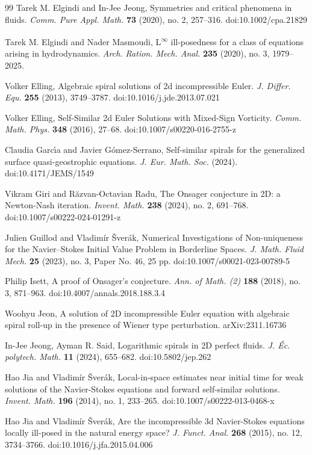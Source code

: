 \documentclass[11pt]{article}
\theoremstyle{definition}
\theoremstyle{remark}
\numberwithin{equation}{section}
\newcommand{\tbf}{\textbf}
\newcommand{\tsup}{\textsuperscript}
\begin{document}
\begin{flushleft}
\begin{thebibliography}{99}
 Tarek M. Elgindi and In-Jee Jeong, Symmetries and critical phenomena in fluids. \textit{Comm. Pure Appl. Math.} \tbf{73} (2020), no. 2, 257–316. doi:10.1002/cpa.21829

 Tarek M. Elgindi and Nader Masmoudi, L\tsup{$\infty$} ill-posedness for a class of equations arising in hydrodynamics. \textit{Arch. Ration. Mech. Anal.} \tbf{235} (2020), no. 3, 1979–2025.

 Volker Elling, Algebraic spiral solutions of 2d incompressible Euler. \textit{J. Differ. Equ.} \tbf{255} (2013), 3749–3787. doi:10.1016/j.jde.2013.07.021

 Volker Elling, Self-Similar 2d Euler Solutions with Mixed-Sign Vorticity. \textit{Comm. Math. Phys.} \tbf{348} (2016), 27–68. doi:10.1007/s00220-016-2755-z

 Claudia Garc\'\i a and Javier G\'omez-Serrano, Self-similar spirals for the generalized surface quasi-geostrophic equations. \textit{J. Eur. Math. Soc.} (2024). doi:10.4171/JEMS/1549

 Vikram Giri and Răzvan-Octavian Radu, The Onsager conjecture in 2D: a Newton-Nash iteration. \textit{Invent. Math.} \tbf{238} (2024), no. 2, 691–768. doi:10.1007/s00222-024-01291-z

 Julien Guillod and Vladimír Šverák, Numerical Investigations of Non-uniqueness for the Navier–Stokes Initial Value Problem in Borderline Spaces. \textit{J. Math. Fluid Mech.} \tbf{25} (2023), no. 3, Paper No. 46, 25 pp. doi:10.1007/s00021-023-00789-5

 Philip Isett, A proof of Onsager's conjecture. \textit{Ann. of Math. (2)} \tbf{188} (2018), no. 3, 871–963. doi:10.4007/annals.2018.188.3.4

 Woohyu Jeon, A solution of 2D incompressible Euler equation with algebraic spiral roll-up in the presence of Wiener type perturbation. arXiv:2311.16736

 In-Jee Jeong, Ayman R. Said, Logarithmic spirals in 2D perfect fluids. \textit{J. Éc. polytech. Math.} \tbf{11} (2024), 655–682. doi:10.5802/jep.262

 Hao Jia and Vladimír Šverák, Local-in-space estimates near initial time for weak solutions of the Navier-Stokes equations and forward self-similar solutions. \textit{Invent. Math.} \tbf{196} (2014), no. 1, 233–265. doi:10.1007/s00222-013-0468-x

 Hao Jia and Vladimír Šverák, Are the incompressible 3d Navier-Stokes equations locally ill-posed in the natural energy space? \textit{J. Funct. Anal.} \tbf{268} (2015), no. 12, 3734–3766. doi:10.1016/j.jfa.2015.04.006


\end{thebibliography}
\end{flushleft}
\end{document}
